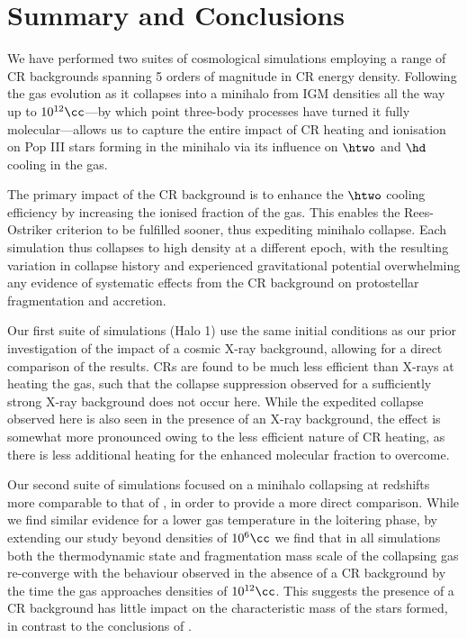 \section{Summary and Conclusions}
\label{conclusions}

We have performed two suites of cosmological simulations employing a range of CR backgrounds spanning 5 orders of magnitude in CR energy density. 
Following the gas evolution as it collapses into a minihalo from IGM densities all the way up to $10^{12}\cc$---by which point three-body processes have turned it fully molecular---allows us to capture the entire impact of CR heating and ionisation on Pop III stars forming in the minihalo via its influence on $\htwo$ and $\hd$ cooling in the gas.

The primary impact of the CR background is to enhance the $\htwo$ cooling efficiency by increasing the ionised fraction of the gas.  
This enables the Rees-Ostriker criterion to be fulfilled sooner, thus expediting minihalo collapse. 
Each simulation thus collapses to high density at a different epoch, with the resulting variation in collapse history and experienced gravitational potential overwhelming any evidence of systematic effects from the CR background on protostellar fragmentation and accretion.

Our first suite of simulations (Halo 1) use the same initial conditions as our prior investigation of the impact of a cosmic X-ray background, allowing for a direct comparison of the results.
CRs are found to be much less efficient than X-rays at heating the gas, such that the collapse suppression observed for a sufficiently strong X-ray background does not occur here.  
While the expedited collapse observed here is also seen in the presence of an X-ray background, the effect is somewhat more pronounced owing to the less efficient nature of CR heating, as there is less additional heating for the enhanced molecular fraction to overcome.

Our second suite of simulations focused on a minihalo collapsing at redshifts more comparable to that of \citet{StacyBromm2007}, in order to provide a more direct comparison.  
While we find similar evidence for a lower gas temperature in the loitering phase, by extending our study beyond densities of $10^6\cc$ we find that in all simulations both the thermodynamic state and fragmentation mass scale of the collapsing gas re-converge with the behaviour observed in the absence of a CR background by the time the gas approaches densities of $10^{12}\cc$.
This suggests the presence of a CR background has little impact on the characteristic mass of the stars formed, in contrast to the conclusions of \citet{StacyBromm2007}.